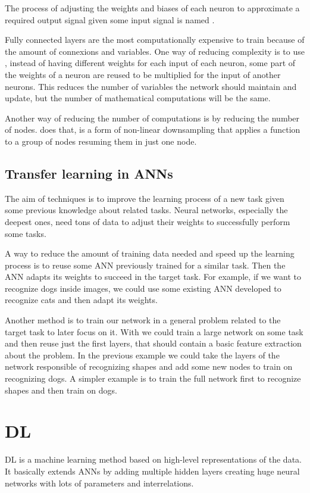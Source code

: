 The process of adjusting the weights and biases of each neuron to approximate a required output signal given some input
signal is named .

Fully connected layers are the most computationally expensive to train because of the amount of connexions and variables.
One way of reducing complexity is to use , instead of having different weights for each input of each neuron,
some part of the weights of a neuron are reused to be multiplied for the input of another neurons.
This reduces the number of variables the network should maintain and update, but the number of mathematical computations
will be the same.

Another way of reducing the number of computations is by reducing the number of nodes.
 does that, is a form of non-linear downsampling that applies a function to a group of nodes resuming them
in just one node.

\subsection{Transfer learning in \aclp{ANN} \label{subsec:TransferLearning}}
The aim of  techniques is to improve the learning process of a new task given some previous knowledge
about related tasks.
Neural networks, especially the deepest ones, need tons of data to adjust their weights to successfully perform some tasks.

A way to reduce the amount of training data needed and speed up the learning process is to reuse some \ac{ANN} previously
trained for a similar task.
Then the \ac{ANN} adapts its weights to succeed in the target task.
For example, if we want to recognize dogs inside images, we could use some existing \ac{ANN} developed to recognize cats and
then adapt its weights.

Another method is to train our network in a general problem related to the target task to later focus on it.
With  we could train a large network on some task and then reuse just the first layers, that should
contain a basic feature extraction about the problem.
In the previous example we could take the layers of the network responsible of recognizing shapes and add some new nodes
to train on recognizing dogs.
A simpler example is to train the full network first to recognize shapes and then train on dogs.

\section{\acl{DL}}
\acf{DL} is a machine learning method based on high-level representations of the data.
It basically extends \acp{ANN} by adding multiple hidden layers creating huge neural networks with lots of parameters and interrelations.

